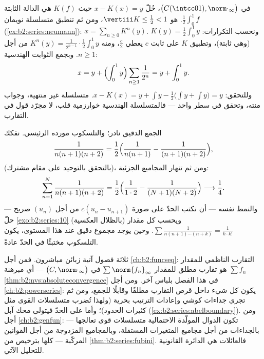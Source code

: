 \begin{example}\label{ex:b2:series:neumannsolve}
في  $\bigl(C(\intcc01),
\norm\cdot_\infty\bigr)$، حُلّ $x - K(x) = y$ حيث $K(f)$ هي
الدالة الثابتة $\frac12\int_0^1 f$.  هو
$\vertiii K \leq \frac12 < 1$، ومن ثم تنطبق متسلسلة نويمان
(\cref{ex:b2:series:neumann}): $x = \sum_{n\geq0} K^n(y)$.
ونحسب التكرارات: $K(y) = \frac12\int_0^1 y$ (وهي ثابتة)،
وتطبيق $K$ على ثابت $c$ يعطي $\frac c2$، ومنه
$K^n(y) = \frac{1}{2^{n-1}}\cdot\frac12\int_0^1 y$ من أجل $n \geq
1$. وبجمع الثوابت الهندسية:
\[
x = y + \Bigl(\int_0^1 y\Bigr)
\sum_{n\geq1}\frac{1}{2^n} = y + \int_0^1 y .
\]
وللتحقق: $x - K(x) = y + \int y - \frac12\bigl(\int y + \int
y\bigr) = y$. متسلسلة غير منتهية، وجواب منته،
وتحقق في سطر واحد --- فالمتسلسلة الهندسية خوارزمية قلب،
لا مجرّد قول في التقارب.
\end{example}

\begin{example}\label{ex:b2:series:telescope}
الجمع الدقيق نادر؛ والتلسكوب مورده الرئيسي.
نفكك
\[
\frac{1}{n(n+1)(n+2)}
= \frac{1}{2}\Bigl(\frac{1}{n(n+1)} -
\frac{1}{(n+1)(n+2)}\Bigr),
\]
(بالتحقق بالتوحيد على مقام مشترك)، ومن ثم تنهار المجاميع
الجزئية:
\[
\sum_{n=1}^{N}\frac{1}{n(n+1)(n+2)}
= \frac12\Bigl(\frac{1}{1\cdot2} -
\frac{1}{(N+1)(N+2)}\Bigr)
\longrightarrow \frac14 .
\]
والنمط نفسه --- أن نكتب الحدّ على صورة $c(u_n - u_{n+1})$ من أجل
$(u_n)$ صريح --- حلّ \cref{exo:b2:series:10}
(بالظلال العكسية) ويحسب كل مقدار $\sum\frac{1}{n(n+1)\cdots(n +
k)} = \frac{1}{k\cdot k!}$. وحين يوجد مجموع دقيق عند هذا
المستوى، يكون التلسكوب مختبئًا في الحدّ عادةً.
\end{example}

\begin{remark}\label{rem:b2:series:perspectives}
ثلاثة فصول آتية زبائن مباشرون. فمن أجل
\cref{ch:b2:funcseq}: التقارب الناظمي للمقدار $\sum f_n$ هو
تقارب مطلق للمقدار $\sum\norm{f_n}_\infty$ في 
$\bigl(C, \norm\cdot_\infty\bigr)$ --- أي مبرهنة
\cref{thm:b2:nvs:absoluteconvergence} في هذا الفصل بلباس آخر. ومن أجل
\cref{ch:b2:powerseries}: يكون كل شيء داخل قرص التقارب
مطلقًا وقابلًا للجمع، ومن ثم تجري جداءات كوشي وإعادات الترتيب
بحرية (ولهذا تُضرب متسلسلات القوى مثل
كثيرات الحدود)؛ وأما على الحدّ فيتولى محك آبل
(\cref{ex:b2:series:abelboundary}). ومن أجل \cref{ch:b2:genfun}:
تكون الدوال المولّدة الاحتمالية متسلسلات قوى تعالجها
--- بالجداءات من أجل مجاميع المتغيرات المستقلة، وبالمجاميع
المزدوجة من أجل القوانين المركّبة --- كلها بترخيص من
\cref{thm:b2:series:fubini}. فالعائلات  هي
الدائرة القانونية للتحليل الآتي.
\end{remark}

